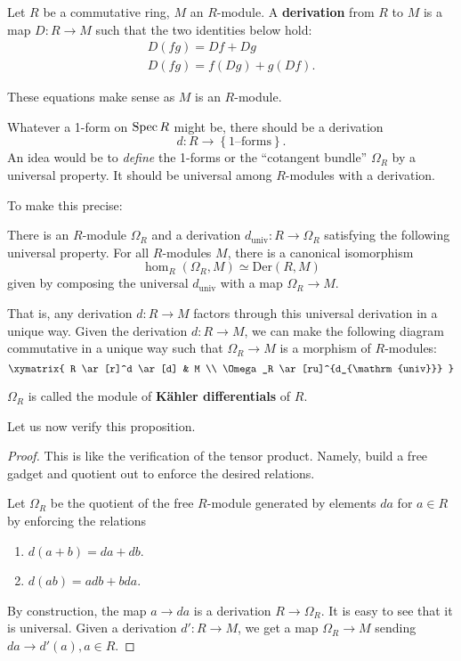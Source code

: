 \begin{definition} 
Let $R$ be a commutative ring, $M$ an $R$-module. A \textbf{derivation} from
$R$ to $M$ is a map $D: R \to M$ such that the two identities below hold:
\begin{gather} D(fg)= Df + Dg  \\
 D(fg) = f(Dg) + g(Df).  \end{gather}
\end{definition} 
These equations make sense as $M$ is an $R$-module.

Whatever a 1-form on $\operatorname{Spec} R$ might be, there should be a derivation
\[ d: R \to \left\{\text{1--forms}\right\}.  \]
An idea would be to \emph{define} the 1-forms or the ``cotangent bundle''
$\Omega_R$ by a
universal property. It should be universal among $R$-modules with a derivation.

To make this precise:
\begin{proposition} 
There is an $R$-module $\Omega_R$ and a derivation $d_{\mathrm{univ}} : R \to
\Omega_R$ satisfying the following universal property. For all $R$-modules
$M$, there is a canonical isomorphism 
\[ \hom_{R}(\Omega_R, M) \simeq \mathrm{Der}(R, M)  \]
given by composing the universal $d_{\mathrm{univ}}$ with a map $\Omega_R \to M$.
\end{proposition} 

That is, any derivation $d: R \to M$ factors through this universal derivation
in a unique way. Given the derivation $d: R \to M$, we can make the following diagram
commutative in a unique way such that $\Omega_R \to M$ is a morphism of
$R$-modules:
\[ 
\xymatrix{
R \ar[r]^d \ar[d]  &  M \\
\Omega_R \ar[ru]^{d_{\mathrm{univ}}}
}
\]

\begin{definition} 
$\Omega_R$ is called the module of \textbf{K\"ahler differentials} of $R$.
\end{definition} 

Let us now verify this proposition.
\begin{proof} 
This is like the verification of the tensor product. Namely, build a free
gadget and quotient out to enforce the desired relations.

Let $\Omega_R$ be the quotient of the free $R$-module generated by elements
$da$ for $a \in R$ by enforcing the relations
\begin{enumerate}
\item $d(a+b) =da + db$. 
\item $d(ab) = adb + bda$.
\end{enumerate}
By construction, the map $a \to da$ is a derivation $R \to \Omega_R$. 
It is easy to see that it is universal. Given a derivation $d': R \to M$, we get a
map $\Omega_R \to M$ sending $da \to d'(a), a \in R$.
\end{proof} 

